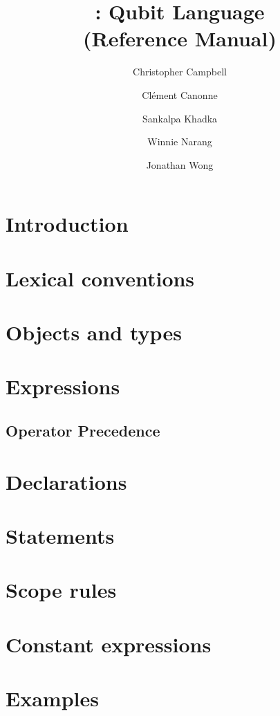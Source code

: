 \documentclass[11pt]{article}
\title{\QL: Qubit Language\\ \Large(Reference Manual)}
\author{
  Christopher Campbell
  \and Cl\'ement Canonne
  \and Sankalpa Khadka
  \and Winnie Narang
  \and Jonathan Wong
}
\begin{document}
\maketitle
\tableofcontents
\clearpage

\section{Introduction}
\section{Lexical conventions}


\section{Objects and types}

\section{Expressions}
\subsection{Operator Precedence}

\section{Declarations}

\section{Statements}
\section{Scope rules}
\section{Constant expressions}

\section{Examples}

\end{document}
